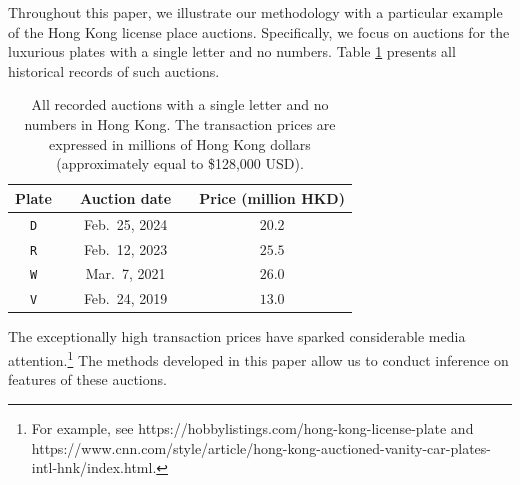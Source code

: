 \begin{runningexample}
Throughout this paper, we illustrate our methodology with a particular example of the Hong Kong license place auctions. Specifically, we focus on auctions for the luxurious plates with a single letter and no numbers. Table \ref{tab:plate} presents all historical records of such auctions.  
\begin{table}[ht]
\centering
\renewcommand{\arraystretch}{1.6}
\begin{tabular}{ccccc}
\hline\hline
Plate &  & Auction date &  & Price (million HKD) \\ \hline
\texttt{D} &  & Feb.\ 25, 2024 &  & $20.2$ \\ 
\texttt{R} &  & Feb.\ 12, 2023 &  & $25.5$ \\ 
\texttt{W} &  & Mar.\ 7, 2021 &  & $26.0$ \\ 
\texttt{V} &  & Feb.\ 24, 2019 &  & $13.0$ \\ 
\hline\hline
\end{tabular}
\caption{All recorded auctions with a single letter and no numbers in Hong Kong. The transaction prices are expressed in millions of Hong Kong dollars (approximately equal to \$128,000 USD).}
\label{tab:plate}
\end{table}

\noindent The exceptionally high transaction prices
have sparked considerable media attention.\footnote{For example, see https://hobbylistings.com/hong-kong-license-plate and https://www.cnn.com/style/article/\linebreak hong-kong-auctioned-vanity-car-plates-intl-hnk/index.html.} The methods developed in this paper allow us to conduct inference on features of these auctions.
\end{runningexample}

